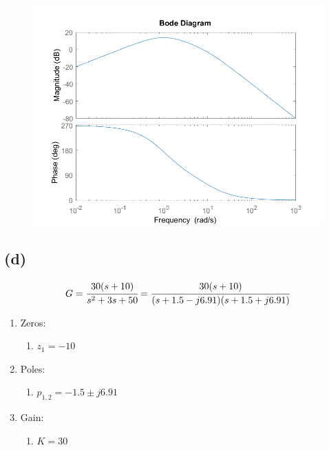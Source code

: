 \documentclass[letter]{article}
\numberwithin{equation}{section}
\begin{document}
\begin{figure}[h!]
	\centering
	\includegraphics[width=\textwidth]{figs/pblm2c.png}
\end{figure}


\newpage
\subsection{(d)}
\[
	G = \cfrac{
		30 (s + 10)
	}{
		s^2 + 3s + 50
	}
	= \cfrac{
		30 (s+10)
	}{
		(s + 1.5 - j6.91) (s + 1.5 + j6.91)
	}
\]
\begin{enumerate}
	\item Zeros:
	\begin{enumerate}
		\item $z_1 = -10$
	\end{enumerate}
	\item Poles:
	\begin{enumerate}
		\item $p_{1,2} = -1.5 \pm j 6.91$
	\end{enumerate}
	\item Gain:
	\begin{enumerate}
		\item $K = 30$
	\end{enumerate}
\end{enumerate}
\end{document}
